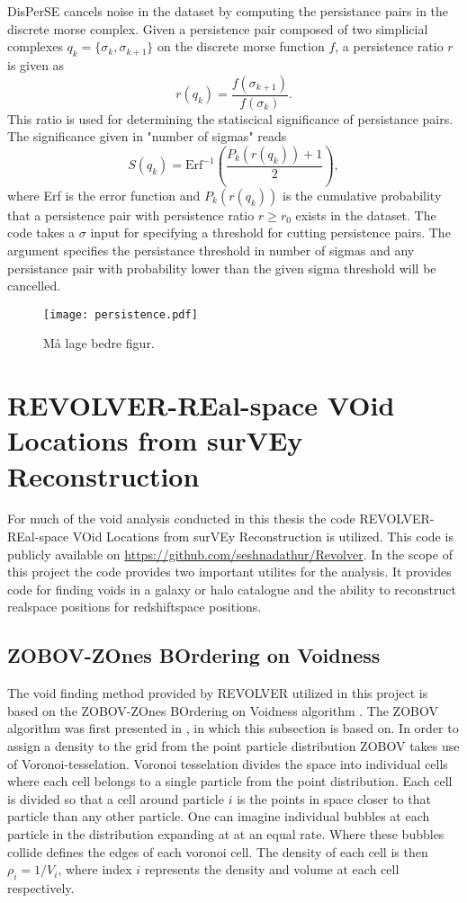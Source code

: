 DisPerSE cancels noise in the dataset by computing the persistance pairs
in the discrete morse complex. Given a persistence pair composed of two
simplicial complexes $q_k=\{\sigma_k,\sigma_{k+1}\}$ on the discrete morse
function $f$, a persistence ratio $r$ is given as
\begin{equation}
    r(q_k)=\frac{f(\sigma_{k+1})}{f(\sigma_k)}.
\end{equation}
This ratio is used for determining the statiscical significance of persistance
pairs. The significance given in "number of sigmas" reads 
\begin{equation}
    S(q_k)=\mathrm{Erf}^{-1}(\frac{P_k(r(q_k))+1}{2}),
\end{equation}
where Erf is the error function and $P_k(r(q_k))$ is the cumulative probability
that a persistence pair with persistence ratio $r\geq r_0$ exists in the
dataset. The code takes a $\sigma$ input for specifying a threshold for cutting
persistence pairs. The argument specifies the persistance threshold in number of
sigmas and any persistance pair with probability lower than the given sigma
threshold will be cancelled.


\begin{figure}\label{fig:persistence}
   \texttt{[image: persistence.pdf]}
   \caption{Må lage bedre figur.}
\end{figure}
\section{REVOLVER-REal-space VOid Locations from surVEy Reconstruction}
For much of the void analysis conducted in this thesis the code
REVOLVER-REal-space VOid Locations from surVEy Reconstruction is utilized. This
code is publicly available on \url{https://github.com/seshnadathur/Revolver}.
In the scope of this project the code provides two important utilites for the
analysis. It provides code for finding voids in a galaxy or halo catalogue and
the ability to reconstruct realspace positions for redshiftspace positions.
\subsection{ZOBOV-ZOnes BOrdering on Voidness}
The void finding method provided by REVOLVER utilized in this project is based
on the ZOBOV-ZOnes BOrdering on Voidness algorithm . The ZOBOV algorithm was
first presented in \cite{Neyrinck_2008}, in which this subsection is based on. In
order to assign a density to the grid from the point particle distribution ZOBOV
takes use of Voronoi-tesselation. Voronoi tesselation divides the space into
individual cells where each cell belongs to a single particle from the point
distribution. Each cell is divided so that a cell around particle $i$ is the
points in space closer to that particle than any other particle. One can imagine
individual bubbles at each particle in the distribution expanding at at an equal
rate. Where these bubbles collide defines the edges of each voronoi cell. The
density of each cell is then $\rho_i=1/V_i$, where index $i$ represents the
density and volume at each cell respectively.\\

